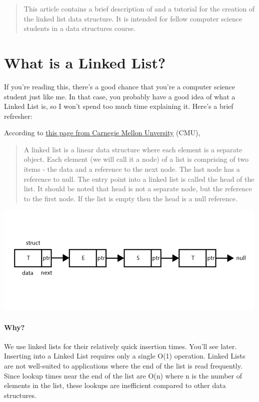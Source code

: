 \documentclass[12pt]{article}
\begin{document}
\maketitle

\begin{abstract}
	This article contains a brief description of and a tutorial for the creation of the linked list data structure. It is intended for fellow computer science students in a data structures course.
\end{abstract}

\newpage

\section{What is a Linked List?}
If you're reading this, there's a good chance that you're a computer science student just like me. In that case, you probably have a good idea of what a Linked List is, so I won't spend too much time explaining it. Here's a brief refresher:

According to \href{https://www.cs.cmu.edu/~adamchik/15-121/lectures/Linked Lists/linked lists.html}{this page from Carnegie Mellon Unversity} (CMU),

\begin{quote}
	A linked list is a linear data structure where each element is a separate object. Each element (we will call it a node) of a list is comprising of two items - the data and a reference to the next node. The last node has a reference to null. The entry point into a linked list is called the head of the list. It should be noted that head is not a separate node, but the reference to the first node. If the list is empty then the head is a null reference.
\end{quote}

\includegraphics[width=\textwidth]{linked_list_diagram}

\paragraph{Why?}
	We use linked lists for their relatively quick insertion times. You'll see later. Inserting into a Linked List requires only a single O(1) operation. Linked Lists are not well-suited to applications where the end of the list is read frequently. Since lookup times near the end of the list are O(n) where n is the number of elements in the list, these lookups are inefficient compared to other data structures.
\end{document}
